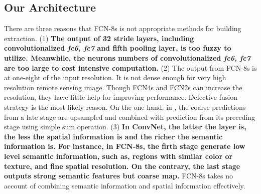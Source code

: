\documentclass[runningheads]{llncs}
\begin{document}
\subsection{Our Architecture} 
   There are three reasons that FCN-8s is not appropriate methods for building extraction. (1) \textbf{The output of 32 stride layers, including convolutionalized \textit{fc6, fc7} and fifth pooling layer, is too fuzzy to utilize. Meanwhile, the neurons numbers of convolutionalized \textit{fc6, fc7} are too large to cost intensive computation.} (2) The output from FCN-8s is at one-eight of the input resolution. It is not dense enough for very high resolution remote sensing image. Though FCN4s and FCN2s can increase the resolution, they have little help for improving performance. Defective fusion strategy is the most likely reason. On the one hand, in \cite{Long2014Fully}, the coarse predictions from a late stage are upsampled and combined with prediction from its preceding stage using simple sum operation. (3) \textbf{In ConvNet, the latter the layer is, the less the spatial information is and the richer the semantic information is. For instance, in FCN-8s, the firth stage generate low level semantic information, such as, regions with similar color or texture, and fine spatial resolution. On the contrary, the last stage outputs strong semantic features but coarse map.} FCN-8s takes no account of combining semantic information and spatial information effectively.  
  
   
\end{document}
